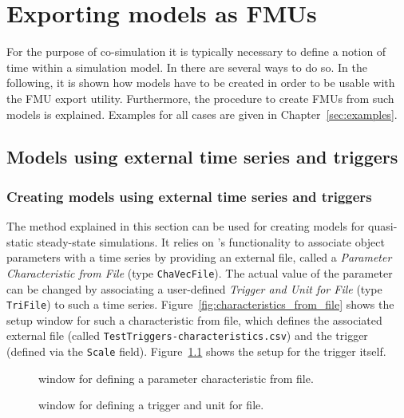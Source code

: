 
\chapter{Exporting \pf models as FMUs}
\label{sec:export}

For the purpose of co-simulation it is typically necessary to define a notion of time within a simulation model.
In \pf there are several ways to do so.
In the following, it is shown how \pf models have to be created in order to be usable with the \fmipp \pf FMU export utility.
Furthermore, the procedure to create FMUs from such models is explained.
Examples for all cases are given in Chapter~\ref{sec:examples}.



\section{Models using external time series and triggers}

\subsection{Creating models using external time series and triggers}

The method explained in this section can be used for creating models for quasi-static steady-state simulations.
It relies on \pf's functionality to associate object parameters with a time series by providing an external file, called a \emph{Parameter Characteristic from File} (type \texttt{ChaVecFile}).
The actual value of the parameter can be changed by associating a user-defined \emph{Trigger and Unit for File} (type \texttt{TriFile}) to such a time series.
Figure~\ref{fig:characteristics_from_file} shows the setup window for such a characteristic from file, which defines the associated external file (called \texttt{TestTriggers-characteristics.csv}) and the trigger (defined via the \texttt{Scale} field).
Figure~\ref{fig:trigger_for_file} shows the setup for the trigger itself.
\begin{figure}[h!]
\vspace*{-2mm}
\caption{\pf window for defining a parameter characteristic from file.}
\label{fig:characteristics_from_file}
\vspace*{1em}
\vspace*{-2mm}
\caption{\pf window for defining a trigger and unit for file.}
\label{fig:trigger_for_file}
\end{figure}

